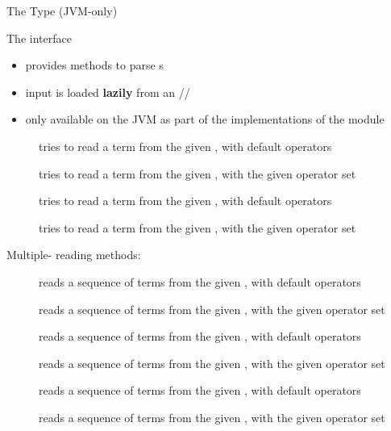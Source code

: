 \documentclass[handout]{beamer}
\begin{document}
\begin{frame}[allowframebreaks]{The  Type (JVM-only)}
    \begin{block}{The  interface}
        \begin{itemize}
            \item provides methods to parse s
            \item input is loaded \textbf{lazily} from an //
            \item only available on the JVM as part of the  implementations of the  module
        \end{itemize}
    \end{block}
    \begin{description}
        \item [] tries to read a term from the given , with default operators
        \item [] tries to read a term from the given , with the given operator set
        \item [] tries to read a term from the given , with default operators
        \item [] tries to read a term from the given , with the given operator set
    \end{description}

    \framebreak

    Multiple- reading methods:
    \begin{description}
        \item [] reads a sequence of terms from the given , with default operators
        \item [] reads a sequence of terms from the given , with the given operator set
        \item [] reads a sequence of terms from the given , with default operators
        \item [] reads a sequence of terms from the given , with the given operator set
        \item [] reads a sequence of terms from the given , with default operators
        \item [] reads a sequence of terms from the given , with the given operator set
    \end{description}


\end{frame}
\end{document}
